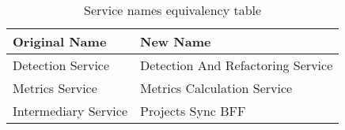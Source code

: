 \begin{table}[!ht]
    \centering
    \caption{Service names equivalency table}
\begin{tabular}{l l}
        \toprule
        \textbf{Original Name} & \textbf{New Name} \\
        \midrule
        Detection Service & Detection And Refactoring Service \\
        Metrics Service & Metrics Calculation Service \\
        Intermediary Service & Projects Sync BFF \\
        \bottomrule
    \end{tabular}
    \label{tab-services-map}
\end{table}
